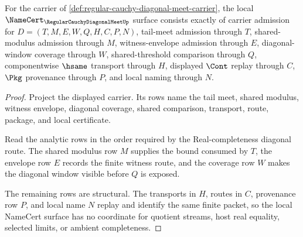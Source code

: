 \begin{theorem}
\label{thm:regular-cauchy-diagonal-meet-namecert-obligations}
For the carrier of \autoref{def:regular-cauchy-diagonal-meet-carrier}, the local $\NameCert_{\RegularCauchyDiagonalMeetUp}$ surface consists exactly of carrier admission for $D=(T,M,E,W,Q,H,C,P,N)$, tail-meet admission through $T$, shared-modulus admission through $M$, witness-envelope admission through $E$, diagonal-window coverage through $W$, shared-threshold comparison through $Q$, componentwise $\hsame$ transport through $H$, displayed $\Cont$ replay through $C$, $\Pkg$ provenance through $P$, and local naming through $N$.
\end{theorem}
\begin{proof}
Project the displayed carrier. Its rows name the tail meet, shared modulus, witness envelope, diagonal coverage, shared comparison, transport, route, package, and local certificate.

Read the analytic rows in the order required by the Real-completeness diagonal route. The shared modulus row $M$ supplies the bound consumed by $T$, the envelope row $E$ records the finite witness route, and the coverage row $W$ makes the diagonal window visible before $Q$ is exposed.

The remaining rows are structural. The transports in $H$, routes in $C$, provenance row $P$, and local name $N$ replay and identify the same finite packet, so the local NameCert surface has no coordinate for quotient streams, host real equality, selected limits, or ambient completeness.
\end{proof}

